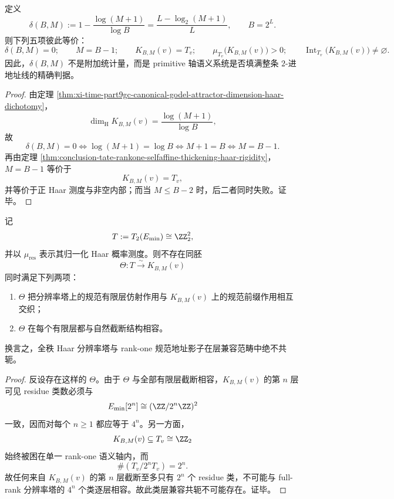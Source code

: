 \begin{corollary}\label{cor:conclusion-tate-rankone-codimension-defect-fivefold-equivalence}
定义
\[
\delta(B,M):=
1-\frac{\log(M+1)}{\log B}
=
\frac{L-\log_2(M+1)}{L},
\qquad
B=2^L.
\]
则下列五项彼此等价：
\[
\delta(B,M)=0;
\qquad
M=B-1;
\qquad
K_{B,M}(v)=T_v;
\qquad
\mu_{T_v}\bigl(K_{B,M}(v)\bigr)>0;
\qquad
\operatorname{Int}_{T_v}\bigl(K_{B,M}(v)\bigr)\neq\varnothing.
\]
因此，\(\delta(B,M)\) 不是附加统计量，而是 primitive 轴语义系统是否填满整条 \(2\)-进地址线的精确判据。
\end{corollary}
\begin{proof}
由定理 \ref{thm:xi-time-part9gc-canonical-godel-attractor-dimension-haar-dichotomy}，
\[
\dim_{\mathrm H}K_{B,M}(v)=\frac{\log(M+1)}{\log B},
\]
故
\[
\delta(B,M)=0
\iff
\log(M+1)=\log B
\iff
M+1=B
\iff
M=B-1.
\]
再由定理 \ref{thm:conclusion-tate-rankone-selfaffine-thickening-haar-rigidity}，\(M=B-1\) 等价于
\[
K_{B,M}(v)=T_v,
\]
并等价于正 Haar 测度与非空内部；而当 \(M\le B-2\) 时，后二者同时失败。证毕。
\end{proof}

\begin{theorem}\label{thm:conclusion-tate-fulltower-rankone-shadow-nonconjugacy}
记
\[
T:=T_2(E_{\min})\cong \ZZ_2^2,
\]
并以 \(\mu_{\mathrm{res}}\) 表示其归一化 Haar 概率测度。则不存在同胚
\[
\Theta:T\xrightarrow{\sim} K_{B,M}(v)
\]
同时满足下列两项：
\begin{enumerate}
  \item \(\Theta\) 把分辨率塔上的规范有限层仿射作用与 \(K_{B,M}(v)\) 上的规范前缀作用相互交织；
  \item \(\Theta\) 在每个有限层都与自然截断结构相容。
\end{enumerate}
换言之，全秩 Haar 分辨率塔与 rank-one 规范地址影子在层兼容范畴中绝不共轭。
\end{theorem}
\begin{proof}
反设存在这样的 \(\Theta\)。由于 \(\Theta\) 与全部有限层截断相容，\(K_{B,M}(v)\) 的第 \(n\) 层可见 residue 类数必须与
\[
E_{\min}[2^n]\cong (\ZZ/2^n\ZZ)^2
\]
一致，因而对每个 \(n\ge 1\) 都应等于 \(4^n\)。另一方面，
\[
K_{B,M}(v)\subseteq T_v\cong \ZZ_2
\]
始终被困在单一 rank-one 语义轴内，而
\[
\#(T_v/2^nT_v)=2^n.
\]
故任何来自 \(K_{B,M}(v)\) 的第 \(n\) 层截断至多只有 \(2^n\) 个 residue 类，不可能与 full-rank 分辨率塔的 \(4^n\) 个类逐层相容。故此类层兼容共轭不可能存在。证毕。
\end{proof}

